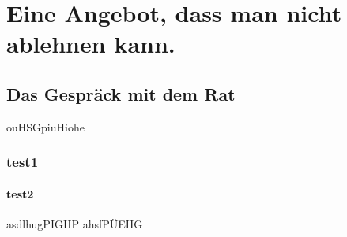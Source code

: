 \documentclass{include/pnp}
\begin{document}

	
	
	
	
	\TableOfContents
	

	\MainMatter

	\chapter[Im Ratshaus]{Eine Angebot, dass man nicht ablehnen kann.}
	\section{Das Gespräck mit dem Rat}
	ouHSGpiuHiohe
	\subsection{test1}
	\subsubsection{test2}
	asdlhugPIGHP
	\newpage
	ahsfPÜEHG
\end{document}
